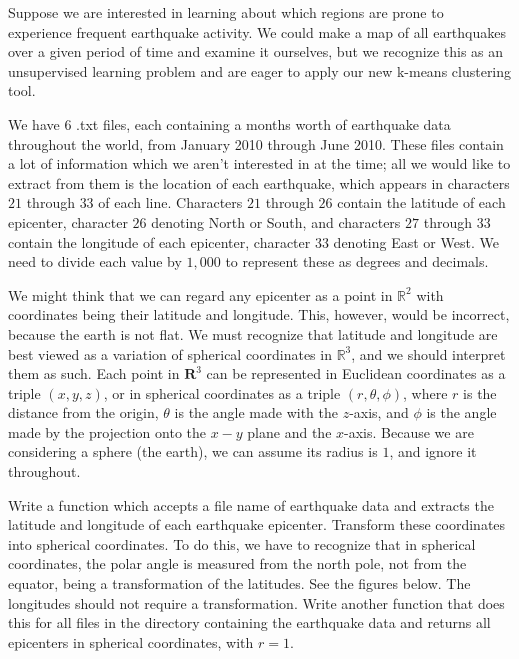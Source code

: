 
Suppose we are interested in learning about which regions are prone to experience frequent earthquake activity. We could make a map of all earthquakes over a given period of time and examine it ourselves, but we recognize this as an unsupervised learning problem and are eager to apply our new k-means clustering tool.

We have 6 .txt files, each containing a months worth of earthquake data throughout the world, from January 2010 through June 2010. These files contain a lot of information which we aren't interested in at the time; all we would like to extract from them is the location of each earthquake, which appears in characters $21$ through $33$ of each line. Characters $21$ through $26$ contain the latitude of each epicenter, character $26$ denoting North or South, and characters $27$ through $33$ contain the longitude of each epicenter, character $33$ denoting East or West. We need to divide each value by $1,000$ to represent these as degrees and decimals.

We might think that we can regard any epicenter as a point in $\mathbb{R}^{2}$ with coordinates being their latitude and longitude. This, however, would be incorrect, because the earth is not flat. We must recognize that latitude and longitude are best viewed as a variation of spherical coordinates in $\mathbb{R}^{3}$, and we should interpret them as such. Each point in $\mathbf{R}^{3}$ can be represented in Euclidean coordinates as a triple $(x,y,z)$, or in spherical coordinates as a triple $(r,\theta,\phi)$, where $r$ is the distance from the origin, $\theta$ is the angle made with the $z$-axis, and $\phi$ is the angle made by the projection onto the $x-y$ plane and the $x$-axis. Because we are considering a sphere (the earth), we can assume its radius is $1$, and ignore it throughout.

\begin{problem}
Write a function which accepts a file name of earthquake data and extracts the latitude and longitude of each earthquake epicenter. Transform these coordinates into spherical coordinates. To do this, we have to recognize that in spherical coordinates, the polar angle is measured from the north pole, not from the equator, being a transformation of the latitudes. See the figures below. The longitudes should not require a transformation. Write another function that does this for all files in the directory containing the earthquake data and returns all epicenters in spherical coordinates, with $r = 1$.
\end{problem}

